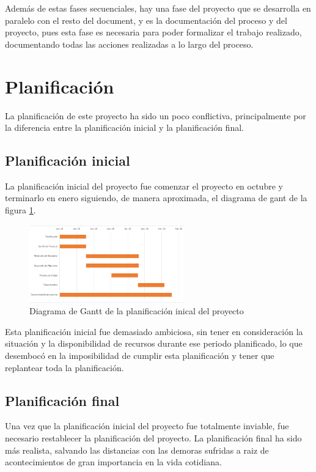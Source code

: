 Además de estas fases secuenciales, hay una fase del proyecto que se desarrolla en paralelo con el resto del document, y es la documentación del proceso y del proyecto, pues esta fase es necesaria para poder formalizar el trabajo realizado, documentando todas las acciones realizadas a lo largo del proceso.

\section{Planificación}

La planificación de este proyecto ha sido un poco conflictiva, principalmente por la diferencia entre la planificación inicial y la planificación final.

\subsection{Planificación inicial}

La planificación inicial del proyecto fue comenzar el proyecto en octubre y terminarlo en enero siguiendo, de manera aproximada, el diagrama de gant de la figura \ref{fig:gant1}.
\begin{figure}[tb]
\centering
\includegraphics[width=0.6\textwidth]{figuras/gant1.png}   
\caption{Diagrama de Gantt de la planificación inical del proyecto}
\label{fig:gant1}
\end{figure}

Esta planificación inicial fue demasiado ambiciosa, sin tener en consideración la situación y la disponibilidad de recursos durante ese periodo planificado, lo que desembocó en la imposibilidad de cumplir esta planificación y tener que replantear toda la planificación.

\subsection{Planificación final}

Una vez que la planificación inicial del proyecto fue totalmente inviable, fue necesario restablecer la planificación del proyecto. La planificación final ha sido más realista, salvando las distancias con las demoras sufridas a raiz de acontecimientos de gran importancia en la vida cotidiana.

